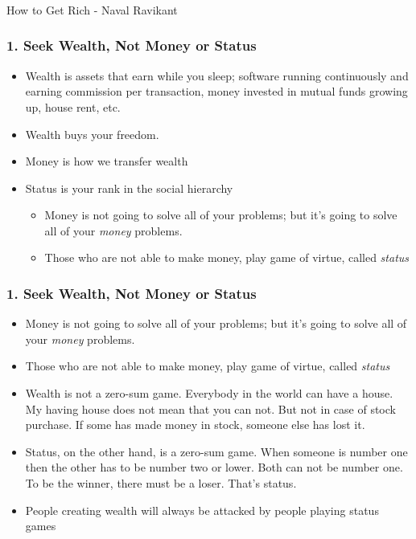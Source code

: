 \begin{frame}[fragile]\frametitle{}
\begin{center}
{\Large How to Get Rich - Naval Ravikant}

\end{center}
\end{frame}

\begin{frame}[fragile]
\frametitle{1. Seek Wealth, Not Money or Status}
\begin{itemize}
\item Wealth is assets that earn while you sleep; software running continuously and earning commission per transaction, money invested in mutual funds growing up, house rent, etc.
\item Wealth buys your freedom.

\item Money is how we transfer wealth
\item Status is your rank in the social hierarchy
\begin{itemize}
\item Money is not going to solve all of your problems; but it’s going to solve all of your {\it money} problems.
\item Those who are not able to make money, play game of virtue, called {\it status}
\end{itemize}

\end{itemize}



\end{frame}


\begin{frame}[fragile]
\frametitle{1. Seek Wealth, Not Money or Status}
\begin{itemize}
\item Money is not going to solve all of your problems; but it’s going to solve all of your {\it money} problems.
\item Those who are not able to make money, play game of virtue, called {\it status}
\item Wealth is not a zero-sum game. Everybody in the world can have a house. My having house does not mean that you can not. But not in case of stock purchase. If some has made money in stock, someone else has lost it.
\item Status, on the other hand, is a zero-sum game. When someone is number one then the other has to be number two or lower. Both can not be number one. To be the winner, there must be a loser. That's status.
\item People creating wealth will always be attacked by people playing status games
\end{itemize}


\end{frame}

